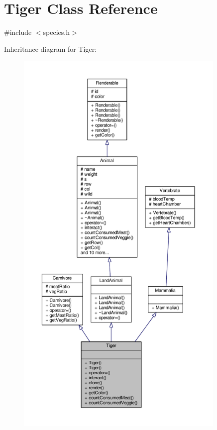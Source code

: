 \hypertarget{classTiger}{}\section{Tiger Class Reference}
\label{classTiger}


{\ttfamily \#include $<$species.\+h$>$}



Inheritance diagram for Tiger\+:
\nopagebreak
\begin{figure}[H]
\begin{center}
\leavevmode
\includegraphics[height=550pt]{classTiger__inherit__graph}
\end{center}
\end{figure}


